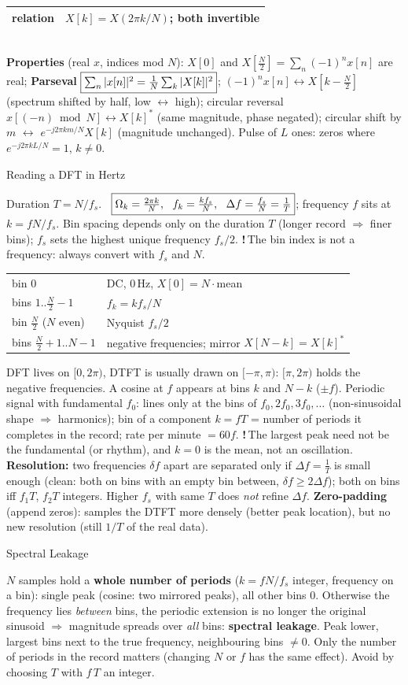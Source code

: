 \documentclass[a4paper,landscape]{article}
\newcommand{\sub}[1]{\par\vspace{0.6pt}\noindent\colorbox{subblue}{\parbox{\dimexpr\linewidth-2\fboxsep}{\bfseries\strut #1}}\par\vspace{0.2pt}}
\newcommand{\warn}[1]{{\color{warnred}\textbf{!}\,#1}}
\newcommand{\bx}[1]{\fbox{$\textstyle #1$}}
\begin{document}
\begin{multicols*}{4}
\begin{tabular}{@{}lll@{}}
relation & \multicolumn{2}{l}{$X[k]=X(2\pi k/N)$; both invertible}\\\bottomrule
\end{tabular}\\
\textbf{Properties} (real $x$, indices mod $N$): $X[0]$ and $X[\frac N2]=\sum_n(-1)^nx[n]$ are real; \textbf{Parseval} $\bx{\sum_n|x[n]|^2=\frac1N\sum_k|X[k]|^2}$; $(-1)^nx[n]\leftrightarrow X[k{-}\frac N2]$ (spectrum shifted by half, low $\leftrightarrow$ high); circular reversal $x[(-n)\bmod N]\leftrightarrow X[k]^*$ (same magnitude, phase negated); circular shift by $m$ $\leftrightarrow$ $e^{-j2\pi km/N}X[k]$ (magnitude unchanged). Pulse of $L$ ones: zeros where $e^{-j2\pi kL/N}=1$, $k\ne0$.
\sub{Reading a DFT in Hertz}
Duration $T=N/f_s$. \ $\bx{\Omega_k=\frac{2\pi k}N,\ \ f_k=\frac{kf_s}N,\ \ \Delta f=\frac{f_s}N=\frac1T}$; frequency $f$ sits at $k=fN/f_s$.
Bin spacing depends only on the duration $T$ (longer record $\Rightarrow$ finer bins); $f_s$ sets the highest unique frequency $f_s/2$. \warn{The bin index is not a frequency: always convert with $f_s$ and $N$.}\\
\begin{tabularx}{\linewidth}{@{}lY@{}}
bin $0$ & DC, $0$\,Hz, $X[0]=N\cdot$mean\\
bins $1..\frac N2{-}1$ & $f_k=kf_s/N$\\
bin $\frac N2$ ($N$ even) & Nyquist $f_s/2$\\
bins $\frac N2{+}1..N{-}1$ & negative frequencies; mirror $X[N{-}k]=X[k]^*$
\end{tabularx}
DFT lives on $[0,2\pi)$, DTFT is usually drawn on $[-\pi,\pi)$: $[\pi,2\pi)$ holds the negative frequencies. A cosine at $f$ appears at bins $k$ and $N{-}k$ ($\pm f$). Periodic signal with fundamental $f_0$: lines only at the bins of $f_0,2f_0,3f_0,\dots$ (non-sinusoidal shape $\Rightarrow$ harmonics); bin of a component $k=fT$ = number of periods it completes in the record; rate per minute $=60f$. \warn{The largest peak need not be the fundamental (or rhythm), and $k{=}0$ is the mean, not an oscillation.}
\textbf{Resolution:} two frequencies $\delta f$ apart are separated only if $\Delta f=\frac1T$ is small enough (clean: both on bins with an empty bin between, $\delta f\ge2\Delta f$); both on bins iff $f_1T$, $f_2T$ integers. Higher $f_s$ with same $T$ does \emph{not} refine $\Delta f$. \textbf{Zero-padding} (append zeros): samples the DTFT more densely (better peak location), but no new resolution (still $1/T$ of the real data).
\sub{Spectral Leakage}
$N$ samples hold a \textbf{whole number of periods} ($k=fN/f_s$ integer, frequency on a bin): single peak (cosine: two mirrored peaks), all other bins $0$. Otherwise the frequency lies \emph{between} bins, the periodic extension is no longer the original sinusoid $\Rightarrow$ magnitude spreads over \emph{all} bins: \textbf{spectral leakage}. Peak lower, largest bins next to the true frequency, neighbouring bins $\ne0$. Only the number of periods in the record matters (changing $N$ or $f$ has the same effect). Avoid by choosing $T$ with $f\,T$ an integer.

\end{multicols*}
\end{document}
